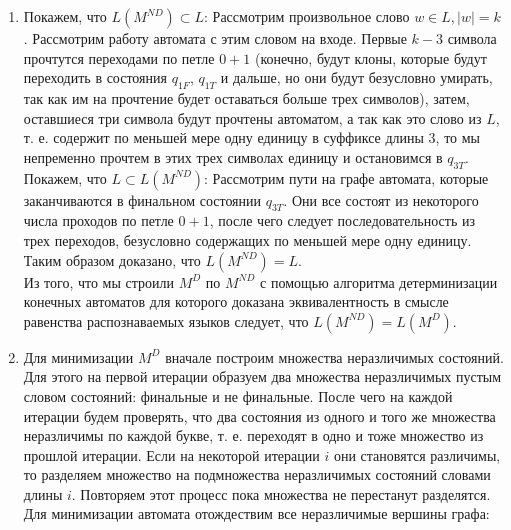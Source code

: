 \begin{enumerate}[label=(\roman{*})]
\begin{figure}
        \caption{}\label{app-ex-fig-3}
\end{figure}

	\item
		Покажем, что $L(M^{ND}) \subset L$: Рассмотрим произвольное слово $w \in L, |w| = k$. Рассмотрим работу автомата с этим словом на входе. Первые $k-3$ символа прочтутся переходами по петле $0+1$ (конечно, будут клоны, которые будут переходить в состояния $q_{1F}$, $q_{1T}$ и дальше, но они будут безусловно умирать, так как им на прочтение будет оставаться больше трех символов), затем, оставшиеся три символа будут прочтены автоматом, а так как это слово из $L$, т. е. содержит по меньшей мере одну единицу в суффиксе длины $3$, то мы непременно прочтем в этих трех символах единицу и остановимся в $q_{3T}$.\\
		Покажем, что $L \subset L(M^{ND})$: Рассмотрим пути на графе автомата, которые заканчиваются в финальном состоянии $q_{3T}$. Они все состоят из некоторого числа проходов по петле $0+1$, после чего следует последовательность из трех переходов, безусловно содержащих по меньшей мере одну единицу.\\
		Таким образом доказано, что $L(M^{ND}) = L$.\\
		Из того, что мы строили $M^D$ по $M^{ND}$ с помощью алгоритма детерминизации конечных автоматов для которого доказана эквивалентность в смысле равенства распознаваемых языков следует, что $L(M^{ND}) = L(M^D)$.
        
	\item Для минимизации $M^{D}$ вначале построим множества неразличимых состояний. Для этого на первой итерации образуем два множества неразличимых пустым словом состояний: финальные и не финальные. После чего на каждой итерации будем проверять, что два состояния из одного и того же множества неразличимы по каждой букве, т. е. переходят в одно и тоже множество из прошлой итерации. Если на некоторой итерации $i$ они становятся различимы, то разделяем множество на подмножества неразличимых состояний словами длины $i$. Повторяем этот процесс пока множества не перестанут разделятся. Для минимизации автомата отождествим все неразличимые вершины графа:


\end{enumerate}
